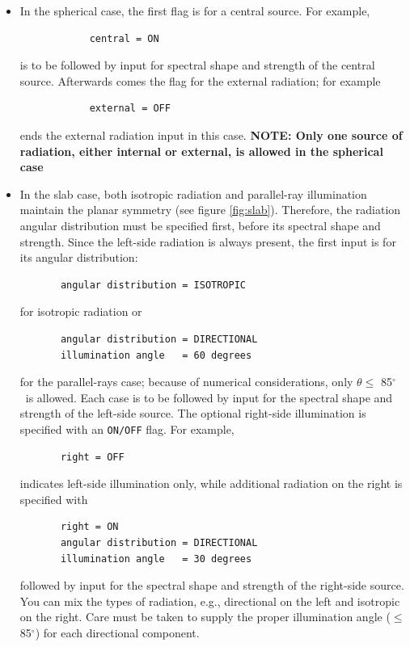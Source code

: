 \documentclass[11pt]{article}
\def\deg    {\hbox{$^\circ$}}
\begin{document}
\begin{itemize}

\item In the spherical case, the first flag is for a central
  source. For example,
\begin{verbatim}
            central = ON
\end{verbatim}
  is to be followed by input for spectral shape and strength of the
  central source. Afterwards comes the flag for the external
  radiation; for example
\begin{verbatim}
            external = OFF
\end{verbatim}
  ends the external radiation input in this case. \textbf{NOTE: Only one
  source of radiation, either internal or external, is allowed in the
  spherical case}

\item In the slab case, both isotropic radiation and parallel-ray
  illumination maintain the planar symmetry (see figure
  \ref{fig:slab}).  Therefore, the radiation angular distribution must
  be specified first, before its spectral shape and strength. Since
  the left-side radiation is always present, the first input is for
  its angular distribution:
\begin{verbatim}
       angular distribution = ISOTROPIC
\end{verbatim}
  for isotropic radiation or
\begin{verbatim}
       angular distribution = DIRECTIONAL
       illumination angle   = 60 degrees
\end{verbatim}
  for the parallel-rays case; because of numerical considerations,
  only $\theta \le$ 85\deg\ is allowed. Each case is to be followed by
  input for the spectral shape and strength of the left-side
  source. The optional right-side illumination is specified with an
  {\tt ON/OFF} flag. For example,
\begin{verbatim}
       right = OFF
\end{verbatim}
  indicates left-side illumination only, while additional radiation on
  the right is specified with
\begin{verbatim}
       right = ON
       angular distribution = DIRECTIONAL
       illumination angle   = 30 degrees
\end{verbatim}
  followed by input for the spectral shape and strength of the
  right-side source. You can mix the types of radiation, e.g.,
  directional on the left and isotropic on the right. Care must be
  taken to supply the proper illumination angle ($\le$ 85\deg) for
  each directional component.
\end{itemize}
\end{document}

